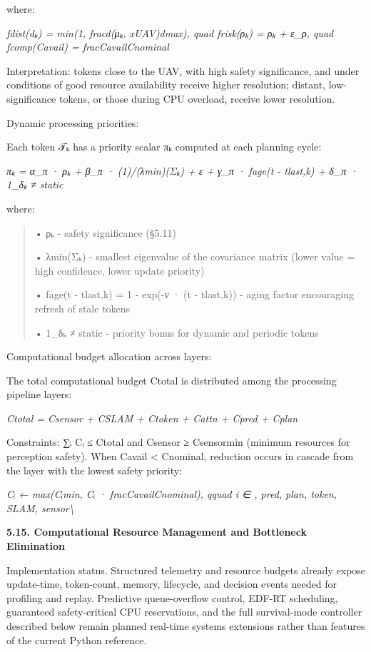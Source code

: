\documentclass[
]{article}
\begin{document}
where:

\emph{fdist(dₖ) = min(1, fracd(μₖ, xUAV)dmax), quad frisk(ρₖ) = ρₖ +
ε\_ρ, quad fcomp(Cavail) = fracCavailCnominal}

Interpretation: tokens close to the UAV, with high safety significance,
and under conditions of good resource availability receive higher
resolution; distant, low-significance tokens, or those during CPU
overload, receive lower resolution.

Dynamic processing priorities:

Each token 𝒯ₖ has a priority scalar πₖ computed at each planning cycle:

\emph{πₖ = α\_π · ρₖ + β\_π · (1)/(λmin)(Σₖ) + ε + γ\_π · fage(t -
tlast,k) + δ\_π · 1\_δₖ ≠ static}

where:

\begin{quote}
• ρₖ - safety significance (§5.11)

• λmin(Σₖ) - smallest eigenvalue of the covariance matrix (lower value =
high confidence, lower update priority)

• fage(t - tlast,k) = 1 - exp(-ν · (t - tlast,k)) - aging factor
encouraging refresh of stale tokens

• 1\_δₖ ≠ static - priority bonus for dynamic and periodic tokens
\end{quote}

Computational budget allocation across layers:

The total computational budget Ctotal is distributed among the
processing pipeline layers:

\emph{Ctotal = Csensor + CSLAM + Ctoken + Cattn + Cpred + Cplan}

Constraints: ∑ᵢ Cᵢ ≤ Ctotal and Csensor ≥ Csensormin (minimum resources
for perception safety). When Cavail \textless{} Cnominal, reduction
occurs in cascade from the layer with the lowest safety priority:

\emph{Cᵢ ← max(Cᵢmin, Cᵢ · fracCavailCnominal), qquad i ∈ , pred, plan,
token, SLAM, sensor\textbackslash{}}

\textbf{5.15. Computational Resource Management and Bottleneck
Elimination}

Implementation status. Structured telemetry and resource budgets already
expose update-time, token-count, memory, lifecycle, and decision events
needed for profiling and replay. Predictive queue-overflow control,
EDF-RT scheduling, guaranteed safety-critical CPU reservations, and the
full survival-mode controller described below remain planned real-time
systems extensions rather than features of the current Python reference.
\end{document}
